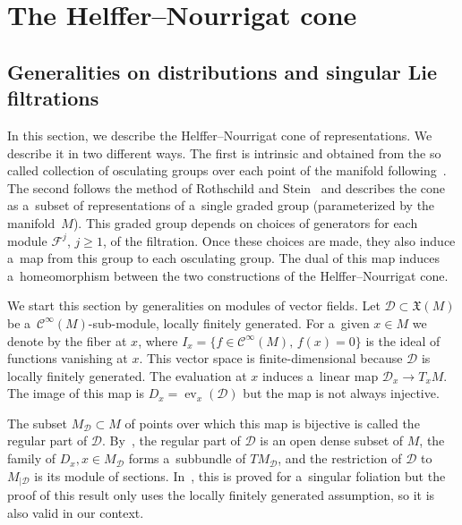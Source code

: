 \documentclass[10pt,a4paper]{article}
\newcommand{\CCC}{\mathscr{C}} %
\newcommand{\F}{\mathcal{F}} %
\newcommand{\ev}{\operatorname{ev}} %
\numberwithin{equation}{section}
\theoremstyle{definition}
\begin{document}
\section{The Helffer--Nourrigat cone} \label{Section: Helffer--Nourrigat cone}

\subsection{Generalities on distributions and singular Lie filtrations}

In this section, we describe the Helffer--Nourrigat cone of representations. We describe it in two different ways. The first is intrinsic and obtained from the so called collection of osculating groups over each point of the manifold following~\cite{AMYMaximalHypoellipticity}. The second follows the method of Rothschild and Stein~\cite{RothschildStein} and describes the cone as a~subset of representations of a~single graded group (parameterized by the manifold~$M$). This graded group depends on choices of generators for each module $\F^j$, $j\geq 1$, of the filtration. Once these choices are made, they also induce a~map from this group to each osculating group. The dual of this map induces a~homeomorphism between the two constructions of the Helffer--Nourrigat cone.

We start this section by generalities on modules of vector fields. Let $\mathcal{D}\subset \mathfrak{X}(M)$ be a~$\CCC^{\infty}(M)$-sub-module, locally finitely generated. For a~given $x \in M$ we denote by  the fiber at $x$, where $I_x= \{ f\in \CCC^{\infty}(M),\, f(x) = 0\}$ is the ideal of functions vanishing at $x$. This vector space is finite-dimensional because $\mathcal{D}$ is locally finitely generated. The evaluation at $x$ induces a~linear map $\mathcal{D}_x \to T_xM$. The image of this map is $D_x = \ev_x(\mathcal{D})$ but the map is not always injective.

The subset $M_{\mathcal{D}} \subset M$ of points over which this map is bijective is called the regular part of $\mathcal{D}$. By~\cite[Proposition~1.5]{AndroulidakisSkandalisHolonomy}, the regular part of $\mathcal{D}$ is an open dense subset of $M$, the family of $D_x, x\in M_{\mathcal{D}}$ forms a~subbundle of $ TM_{\mathcal{D}}$, and the restriction of $\mathcal{D}$ to $M_{|\mathcal{D}}$ is its module of sections. In~\cite{AndroulidakisSkandalisHolonomy}, this is proved for a~singular foliation but the proof of this result only uses the locally finitely generated assumption, so it is also valid in our context.
\end{document}
